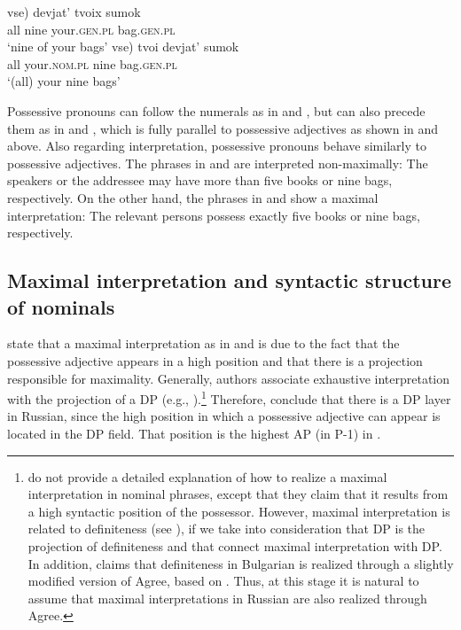 \documentclass[output=paper,
colorlinks,
citecolor=brown,
newtxmath
]{langscibook}
\begin{document}
\ea\label{Num-Possprn2}
\ea\label{NumPossprn2}
\gll \minsp{(*} vse) devjat' tvoix sumok\\
{} all nine your.\textsc{gen.pl} bag.\textsc{gen.pl}\\
\glt `nine of your bags'
\ex\label{PossprnNum2}
\gll \minsp{(} vse) tvoi devjat' sumok\\
{} all your.\textsc{nom.pl} nine bag.\textsc{gen.pl}\\
\glt `(all) your nine bags'
\z\z

    \largerpage[-1] %

\noindent Possessive pronouns can follow the numerals as in  and , but can also precede them as in  and , which is fully parallel to possessive adjectives as shown in  and  above. Also regarding interpretation, possessive pronouns behave similarly to possessive adjectives. The phrases in  and  are interpreted non-maximally: The speakers or the addressee may have more than five books or nine bags, respectively. On the other hand, the phrases in  and  show a maximal interpretation: The relevant persons possess exactly five books or nine bags, respectively.

\subsection{Maximal interpretation and syntactic structure of nominals}\label{MS}

\citet{Kagan.Pereltsvaig2012} state that a maximal interpretation as in  and  is due to the fact that the possessive adjective appears in a high position and that there is a projection responsible for maximality. Generally, authors associate exhaustive interpretation with the projection of a DP (e.g., \citealp{Zamparelli2000}).\footnote{\citet{Kagan.Pereltsvaig2012} do not provide a detailed explanation of how to realize a maximal interpretation in nominal phrases, except that they claim that it results from a high syntactic position of the possessor. However, maximal interpretation is related to definiteness (see ), if we take into consideration that DP is the projection of definiteness \citep[see][]{Lyons1999} and that \citeauthor{Kagan.Pereltsvaig2012} connect maximal interpretation with DP. In addition, \citet{Koev2011} claims that definiteness in Bulgarian is realized through a slightly modified version of Agree, based on \citet{Baker2008}. Thus, at this stage it is natural to assume that maximal interpretations in Russian are also realized through Agree.} Therefore, \citeauthor{Kagan.Pereltsvaig2012} conclude that there is a DP layer in Russian, since the high position in which a possessive adjective can appear is located in the DP field. That position is the highest AP (in \textalpha P-1) in .
\end{document}
